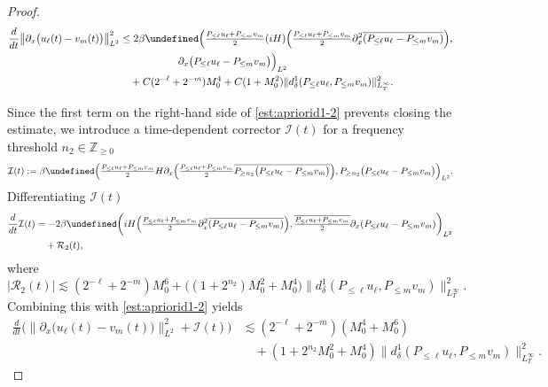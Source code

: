 \documentclass{amsart}
\numberwithin{equation}{section}
\newcommand{\Z}{\mathbb{Z}}
\let\Re=\undefined\DeclareMathOperator{\Re}{Re}
\begin{document}
\begin{proof}
\begin{equation}\label{est:apriorid1-2}
\begin{aligned}
\frac{d}{dt}\big\| \partial_x\big( u_\ell(t)-v_m(t)\big) \big\|_{L^2}^2
&\leq 2\beta \Re \Big( \tfrac{P_{\leq \ell}u_\ell+P_{\leq m}v_m}{2}(iH)\Big(\tfrac{P_{\leq \ell}u_\ell+P_{\leq m}v_m}{2}\partial_x^2\overline{(P_{\leq \ell}u_\ell-P_{\leq m}v_m)}\Big) , \\
&\hspace{2cm} \partial_x\big(P_{\leq \ell}u_\ell-P_{\leq m}v_m\big) \Big)_{L^2} \\
&\quad +C(2^{-\ell}+2^{-m})M_0^4+C(1+M_0^2)\| d^1_\delta(P_{\leq \ell}u_\ell,P_{\leq m}v_m)\|_{L^\infty_T}^2.
\end{aligned}
\end{equation}

Since the first term on the right-hand side of \eqref{est:apriorid1-2} prevents closing the estimate, we introduce a time-dependent corrector $\mathcal{I}(t)$ for a frequency threshold $n_2\in \Z_{\geq 0}$
\[ 
\mathcal{I}(t):=\beta \Re \Big( \tfrac{P_{\leq \ell}u_\ell+P_{\leq m}v_m}{2}H\partial_x \Big(\tfrac{P_{\leq \ell}u_\ell+P_{\leq m}v_m}{2}\overline{P_{\geq n_2}\big(P_{\leq \ell}u_\ell-P_{\leq m}v_m\big)}\Big) , P_{\geq n_2}\big(P_{\leq \ell}u_\ell-P_{\leq m}v_m\big) \Big)_{L^2} .
\]
Differentiating $\mathcal{I}(t)$
\begin{equation}\label{est:apriorid1-3}
\begin{aligned}
    \frac{d}{dt}\mathcal{I}(t)
    &= -2\beta \Re \bigg( iH\Big(\tfrac{P_{\leq \ell}u_\ell+P_{\leq m}v_m}{2} \partial_x^2\overline{(P_{\leq \ell}u_\ell - P_{\leq m}v_m)}\Big) , \overline{\tfrac{P_{\leq \ell}u_\ell+P_{\leq m}v_m}{2}}\partial_x(P_{\leq \ell}u_\ell - P_{\leq m}v_m)\bigg)_{L^2} \\
    &\quad + \mathcal{R}_2(t),
\end{aligned}
\end{equation}
where 
\[ |\mathcal{R}_2(t)| \lesssim (2^{-\ell}+2^{-m})M_0^6 + \big( (1+2^{n_2})M_0^2+M_0^4\big) \| d^1_\delta(P_{\leq \ell}u_\ell,P_{\leq m}v_m)\|_{L^\infty_T}^2. \] 
Combining this with \eqref{est:apriorid1-2} yields
\begin{equation}\label{est:apriorid1-5}
\begin{aligned}
\frac{d}{dt}\Big( \big\| \partial_x\big( u_\ell(t)-v_m(t)\big) \big\|_{L^2}^2 +\mathcal{I}(t)\Big) &\lesssim (2^{-\ell}+2^{-m})(M_0^4+M_0^6) \\
&\quad +(1+2^{n_2}M_0^2+M_0^4) \| d^1_\delta(P_{\leq \ell}u_\ell,P_{\leq m}v_m)\|_{L^\infty_T}^2.

\end{aligned}
\end{equation}
\end{proof}
\end{document}
